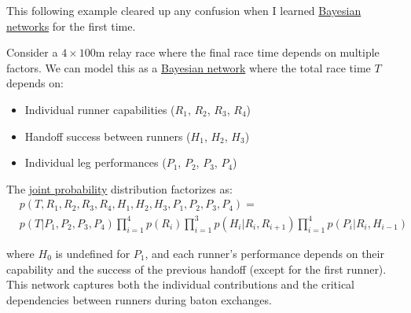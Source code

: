 \documentclass{article}
\begin{document}
  This following example cleared up any confusion when I learned \hyperref[def:bayesian-network]{Bayesian networks} for the first time. 

  \begin{example}
    \label{ex:relay-race}
    Consider a $4\times100$m relay race where the final race time depends on multiple factors. We can model this as a \hyperref[def:bayesian-network]{Bayesian network} where the total race time $T$ depends on:
    \begin{itemize}
      \item Individual runner capabilities ($R_1$, $R_2$, $R_3$, $R_4$)
      \item Handoff success between runners ($H_1$, $H_2$, $H_3$)
      \item Individual leg performances ($P_1$, $P_2$, $P_3$, $P_4$)
    \end{itemize}

    The \hyperref[prob-def:joint-probability-law]{joint probability} distribution factorizes as:
    \begin{align*}
      & p(T, R_1, R_2, R_3, R_4, H_1, H_2, H_3, P_1, P_2, P_3, P_4) = \\
      & p(T|P_1,P_2,P_3,P_4) \prod_{i=1}^4 p(R_i) \prod_{i=1}^3 p(H_i|R_i,R_{i+1}) \prod_{i=1}^4 p(P_i|R_i,H_{i-1})
    \end{align*}

    \noindent where $H_0$ is undefined for $P_1$, and each runner's performance depends on their capability and the success of the previous handoff (except for the first runner). This network captures both the individual contributions and the critical dependencies between runners during baton exchanges.

    \begin{figure}[H]
      \centering 
\end{figure}
\end{example}
\end{document}
